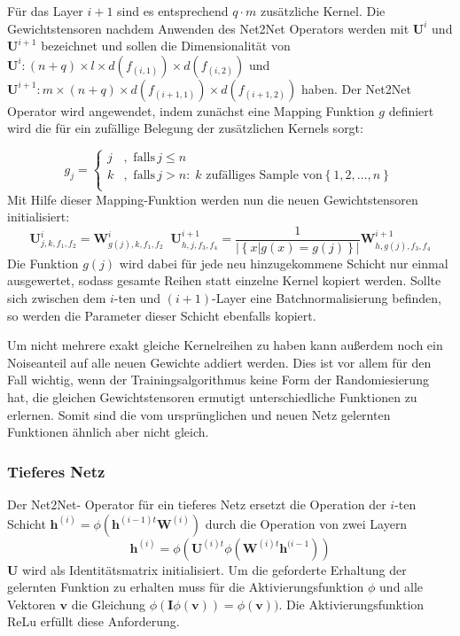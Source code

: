 Für das Layer $i+1$ sind es entsprechend $q \cdot m $ zusätzliche Kernel. Die Gewichtstensoren nachdem Anwenden des Net2Net Operators werden mit $\mathbf{U}^i$ und $\mathbf{U}^{i+1}$ bezeichnet und sollen die Dimensionalität von $\mathbf{U}^i: (n+q) \times l \times d(f_{(i,1)}) \times d(f_{(i,2)})$ und $\mathbf{U}^{i+1}: m \times (n+q) \times d(f_{(i+1,1)}) \times d(f_{(i+1,2)})$ haben. Der Net2Net Operator wird angewendet, indem zunächst eine Mapping Funktion $g$ definiert wird die für ein zufällige Belegung der zusätzlichen Kernels sorgt:

\begin{equation}
 g_{j} =  
 \begin{cases}
 j & , \text{ falls} \, j \leq n \\
 k & , \text{ falls} \, j>n : \;  k \text{ zufälliges Sample von} \left\{ 1,2,\ldots, n \right\} \\ 
 \end{cases} 
 \end{equation}
 Mit Hilfe dieser Mapping-Funktion werden nun die neuen Gewichtstensoren initialisiert:
 \begin{equation}
 \mathbf{U}^i_{j,k,f_1,f_2} = \mathbf{W}^i_{g(j),k,f_1,f_2} \; \; \mathbf{U}^{i+1}_{h,j,f_3,f_4}= \frac{1}{|\left\{ x | g(x)=g(j)\right\}|}\mathbf{W}^{i+1}_{h,g(j),f_3,f_4}
 \end{equation}
Die Funktion $g(j)$ wird dabei für jede neu hinzugekommene Schicht nur einmal ausgewertet, sodass gesamte Reihen statt einzelne Kernel kopiert werden. Sollte sich zwischen dem $i$-ten und $(i+1)$-Layer eine Batchnormalisierung befinden, so werden die Parameter dieser Schicht ebenfalls kopiert.

Um nicht mehrere exakt gleiche Kernelreihen zu haben kann außerdem noch ein Noiseanteil auf alle neuen Gewichte addiert werden. Dies ist vor allem für den Fall wichtig, wenn der Trainingsalgorithmus keine Form der Randomiesierung hat, die gleichen Gewichtstensoren ermutigt unterschiedliche Funktionen zu erlernen. Somit sind die vom ursprünglichen und neuen Netz gelernten Funktionen ähnlich aber nicht gleich.

\subsubsection{Tieferes Netz}

Der Net2Net- Operator für ein tieferes Netz ersetzt die Operation der $i$-ten Schicht $\mathbf{h}^{(i)} = \phi\left(\mathbf{h}^{(i-1)t} \mathbf{W}^{(i)}\right)$ durch die Operation von zwei Layern  
\begin{equation}
\mathbf{h}^{(i)} = \phi( \mathbf{U}^{(i)t} \phi(\mathbf{W}^{(i)t}  \mathbf{h}^{(i-1}) )
\end{equation}
$\mathbf{U}$ wird als Identitätsmatrix initialisiert. Um die geforderte Erhaltung der gelernten Funktion zu erhalten muss für die Aktivierungsfunktion $\phi$ und alle Vektoren $\mathbf{v}$ die Gleichung $\phi(\mathbf{I} \phi(\mathbf{v}))=\phi(\mathbf{v}))$. Die Aktivierungsfunktion ReLu erfüllt diese Anforderung.


